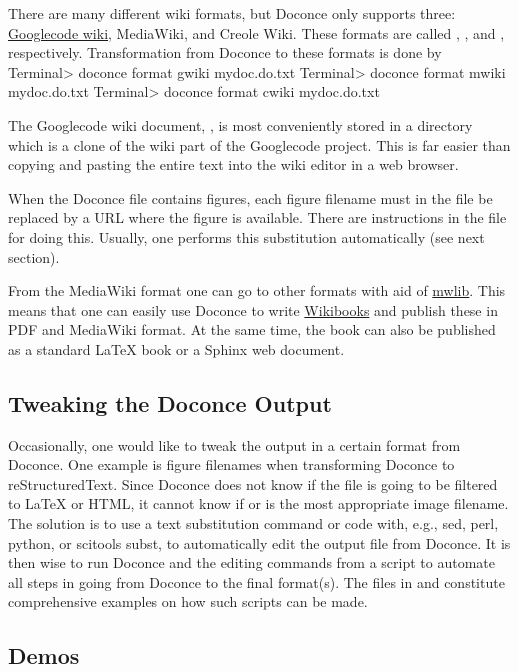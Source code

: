\documentclass{book}
\begin{document}
There are many different wiki formats, but Doconce only supports three:
\href{{http://code.google.com/p/support/wiki/WikiSyntax}}{Googlecode wiki}, MediaWiki, and Creole Wiki. These formats are called
, , and , respectively.
Transformation from Doconce to these formats is done by
\bsys
Terminal> doconce format gwiki mydoc.do.txt
Terminal> doconce format mwiki mydoc.do.txt
Terminal> doconce format cwiki mydoc.do.txt
\esys

The Googlecode wiki document, , is most conveniently stored
in a directory which is a clone of the wiki part of the Googlecode project.
This is far easier than copying and pasting the entire text into the
wiki editor in a web browser.

When the Doconce file contains figures, each figure filename must in
the  file be replaced by a URL where the figure is
available. There are instructions in the file for doing this. Usually,
one performs this substitution automatically (see next section).

From the MediaWiki format one can go to other formats with aid
of \href{{http://pediapress.com/code/}}{mwlib}. This means that one can
easily use Doconce to write \href{{http://en.wikibooks.org}}{Wikibooks}
and publish these in PDF and MediaWiki format.
At the same time, the book can also be published as a
standard {\LaTeX} book or a Sphinx web document.

\subsection{Tweaking the Doconce Output}

Occasionally, one would like to tweak the output in a certain format
from Doconce. One example is figure filenames when transforming
Doconce to reStructuredText. Since Doconce does not know if the
 file is going to be filtered to {\LaTeX} or HTML, it cannot know
if  or  is the most appropriate image filename.
The solution is to use a text substitution command or code with, e.g., sed,
perl, python, or scitools subst, to automatically edit the output file
from Doconce. It is then wise to run Doconce and the editing commands
from a script to automate all steps in going from Doconce to the final
format(s). The  files in  and 
constitute comprehensive examples on how such scripts can be made.

\subsection{Demos}
\end{document}
